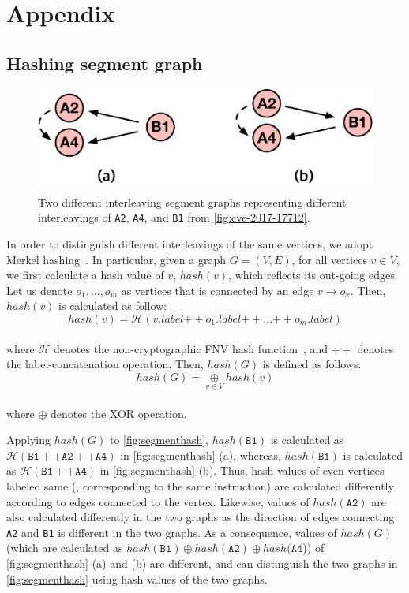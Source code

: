 \section{Appendix}


\subsection{Hashing segment graph}
\label{s:appendix:hash}

\begin{figure}[h]
  \centering
  \includegraphics[width=0.7\linewidth]{fig/segmenthash.pdf}
  \caption{Two different interleaving segment graphs representing
    different interleavings of \texttt{A2}, \texttt{A4}, and
    \texttt{B1} from \autoref{fig:cve-2017-17712}.}
  \label{fig:segmenthash}
\end{figure}
%

In order to distinguish different interleavings of the same vertices,
we adopt Merkel hashing~\cite{treehashing, treehashing2}.
%
In particular, given a graph $G = (V, E)$, for all vertices $v \in V$,
we first calculate a hash value of $v$, $hash(v)$, which reflects its
out-going edges.
%
Let us denote $o_1, ..., o_m$ as vertices that is connected by an edge
$v \rightarrow o_x$. Then, $hash(v)$ is calculated as follow:
%
%
\\
\[
  hash(v) = \mathcal{H}(v.label {++} o_1.label {++} ... {++}
  o_m.label)
\]
\\
%
where $\mathcal{H}$ denotes the non-cryptographic FNV hash
function~\cite{fnv, fnv-go}, and ${++}$ denotes the
label-concatenation operation.
%
Then, $hash(G)$ is defined as follows:
%
\\[1pt]
\[
  hash(G) = \underset{v \in V}{\oplus} hash(v)
\]
\\[1pt]
%
where $\oplus$ denotes the XOR operation.

Applying $hash(G)$ to \autoref{fig:segmenthash}, $hash(\texttt{B1})$
is calculated as
$\mathcal{H}(\texttt{B1} ++ \texttt{A2} ++ \texttt{A4})$ in
\autoref{fig:segmenthash}-(a), whereas, $hash(\texttt{B1})$ is
calculated as $\mathcal{H}(\texttt{B1} ++ \texttt{A4})$ in
\autoref{fig:segmenthash}-(b).
%
Thus, hash values of even vertices labeled same (\ie, corresponding to
the same instruction) are calculated differently according to edges
connected to the vertex.
%
Likewise, values of $hash(\texttt{A2})$ are also calculated
differently in the two graphs as the direction of edges connecting
\texttt{A2} and \texttt{B1} is different in the two graphs.
%
As a consequence, values of $hash(G)$ (which are calculated as
$hash(\texttt{B1}) \oplus hash(\texttt{A2}) \oplus hash(\texttt{A4}$))
of \autoref{fig:segmenthash}-(a) and (b) are different, and \sys can
distinguish the two graphs in \autoref{fig:segmenthash} using hash
values of the two graphs.



